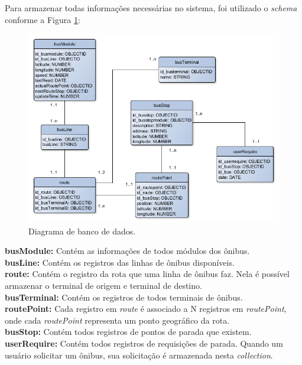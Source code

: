 \documentclass[
	12pt,				%
	oneside,			%
	a4paper,			%
	brazil				%
]{abntex2}
\begin{document}
\newpage

Para armazenar todas informações necessárias no sistema, foi utilizado o \textit{schema} conforme a Figura \ref{bancodedados}:

\begin{figure}[H]
\centering
\includegraphics[width=15cm, center]{images/database-api.png}
\caption{Diagrama de banco de dados.}
\label{bancodedados}
\end{figure}

\noindent \textbf{busModule:} Contém as informações de todos módulos dos ônibus.\\
\textbf{busLine:} Contém os registros das linhas de ônibus disponíveis.\\
\textbf{route:} Contém o registro da rota que uma linha de ônibus faz. Nela é possível armazenar o terminal de origem e terminal de destino.\\
\textbf{busTerminal:} Contém os registros de todos terminais de ônibus.\\
\textbf{routePoint:} Cada registro em \textit{route} é associado a N registros em \textit{routePoint}, onde cada \textit{routePoint} representa um ponto geográfico da rota.\\
\textbf{busStop:} Contém todos registros de pontos de parada que existem. \\
\textbf{userRequire:} Contém todos registros de requisições de parada. Quando um usuário solicitar um ônibus, sua solicitação é armazenada nesta \textit{collection}.\\

\newpage
\end{document}
